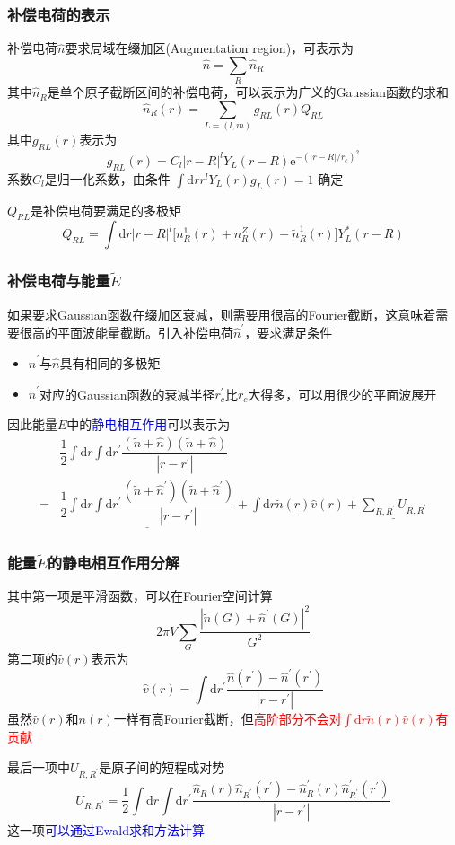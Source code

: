 \documentclass[cjk,slidestop,compress,mathserif,blue]{beamer}
\begin{document}
\frame
{
	\frametitle{补偿电荷的表示}
	补偿电荷$\hat n$要求局域在缀加区(\textrm{Augmentation region})，可表示为
	$$\hat n=\sum_R\hat n_R$$
	其中$\hat n_R$是单个原子截断区间的补偿电荷，可以表示为广义的\textrm{Gaussian}函数的求和
	$$\hat n_R(r)=\sum_{L=(l,m)}g_{RL}(r)Q_{RL}$$
	其中$g_{RL}(r)$表示为
	$$g_{RL}(r)=C_l|r-R|^lY_L(r-R)\mathrm{e}^{-(|r-R|/r_c)^2}$$
	系数$C_l$是归一化系数，由条件
	$\int\mathrm{d}rr^lY_L(r)g_L(r)=1$
	确定

	$Q_{RL}$是补偿电荷要满足的多极矩
	$$Q_{RL}=\int\mathrm{d}r|r-R|^l\big[n_R^1(r)+n_R^Z(r)-\tilde n_R^1(r)\big]Y_L^{\ast}(r-R)$$
}

\frame
{
	\frametitle{补偿电荷与能量$\tilde E$}
	如果要求\textrm{Gaussian}函数在缀加区衰减，则需要用很高的\textrm{Fourier}截断，这意味着需要很高的平面波能量截断。引入补偿电荷$\hat n^{\prime}$，要求满足条件
	\begin{itemize}
		\item $\hat n^{\prime}$与$\hat n$具有相同的多极矩
		\item $\hat n^{\prime}$对应的\textrm{Gaussian}函数的衰减半径$r_c^{\prime}$比$r_c$大得多，可以用很少的平面波展开
	\end{itemize}
	因此能量$\tilde E$中的\textcolor{blue}{静电相互作用}可以表示为
	\begin{displaymath}
		\begin{aligned}
			&\dfrac12\int\mathrm{d}r\int\mathrm{d}r^{\prime}\dfrac{(\tilde n+\hat n)(\tilde n+\hat n)}{|r-r^{\prime}|}\\
			=&\underline{\dfrac12\int\mathrm{d}r\int\mathrm{d}r^{\prime}\dfrac{(\tilde n+\hat n^{\prime})(\tilde n+\hat n^{\prime})}{|r-r^{\prime}|}}
			+\underline{\int\mathrm{d}r\tilde n(r)\hat v(r)}+\underline{\sum_{R,R^{\prime}}U_{R,R^{\prime}}}
		\end{aligned}
	\end{displaymath}
}

\frame
{
	\frametitle{能量$\tilde E$的静电相互作用分解}
	其中第一项是平滑函数，可以在\textrm{Fourier}空间计算
	$$2\pi V\sum_G\dfrac{|\tilde n(G)+\hat n^{\prime}(G)|^2}{G^2}$$
	第二项的$\hat v(r)$表示为
	$$\hat v(r)=\int\mathrm{d}r^{\prime}\dfrac{\hat n(r^{\prime})-\hat n^{\prime}(r^{\prime})}{|r-r^{\prime}|}$$
	虽然$\hat v(r)$和$n(r)$一样有高\textrm{Fourier}截断，但\textcolor{red}{高阶部分不会对$\int\mathrm{d}r\tilde n(r)\hat v(r)$有贡献}

	最后一项中$U_{R,R^{\prime}}$是原子间的短程成对势
	$$U_{R,R^{\prime}}=\dfrac12\int\mathrm{d}r\int\mathrm{d}r^{\prime}\dfrac{\hat n_R(r)\hat n_{R^{\prime}}(r^{\prime})-\hat n_R^{\prime}(r)\hat n_{R^{\prime}}^{\prime}(r^{\prime})}{|r-r^{\prime}|}$$
	这一项\textcolor{blue}{可以通过\textrm{Ewald}求和方法计算}
}
\end{document}

